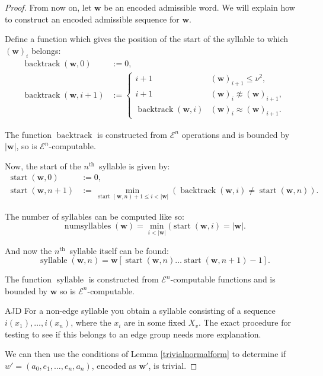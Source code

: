 \documentclass[a4paper]{article}
\newcommand{\grz}[1]{$\mathcal{E}^{#1}$}	%
\newcommand{\nth}{$n^{\textrm{th}}$~}	%
\newcommand{\wvec}{\mathbf{w}}	%
\newcommand{\recur}[1]{\begin{equation} \begin{split} #1 \end{split} \end{equation}}	%
\theoremstyle{plain}
\theoremstyle{definition}
\newenvironment{ad}{\noindent\color{blue} AJD }{}
\newcommand{\ajd}[1]{
\begin{ad} #1 \end{ad}}
\begin{document}
\begin{proof}
From now on, let $\wvec$ be an encoded admissible word.  We will explain how to construct an encoded admissible sequence for $\wvec$.

Define a function which gives the position of the start of the syllable to which $(\wvec)_i$ belongs:
\recur{
	\operatorname{backtrack}(\wvec,0) &:= 0, \\
	\operatorname{backtrack}(\wvec,i+1) &:= \begin{cases}
																					i+1	&	(\wvec)_{i+1} \leq \nu^2, \\
																					i+1	&	(\wvec)_i \not \approx (\wvec)_{i+1}, \\
																					\operatorname{backtrack}(\wvec,i)	&	(\wvec)_i \approx (\wvec)_{i+1}.
																				\end{cases}
}

The function $\operatorname{backtrack}$ is constructed from \grz{n} operations and is bounded by $|\wvec|$, so is \grz{n}-computable.

Now, the start of the \nth syllable is given by:
\recur{
\operatorname{start}(\wvec,0) &:= 0, \\
\operatorname{start}(\wvec,n+1) &:= \min_{\operatorname{start}(\wvec,n)+1 \leq i < |\wvec|} (\operatorname{backtrack}(\wvec,i) \neq \operatorname{start}(\wvec,n)).
}

The number of syllables can be computed like so:
\begin{equation} \operatorname{numsyllables}(\wvec) = \min_{i < |\wvec|} ( \operatorname{start}(\wvec,i) = |\wvec|. \end{equation}

And now the \nth syllable itself can be found:
\begin{equation} \operatorname{syllable}(\wvec,n) = \wvec[\operatorname{start}(\wvec,n) \dots \operatorname{start}(\wvec,n+1)-1]. \end{equation}

The function $\operatorname{syllable}$ is constructed from \grz{n}-computable functions and is bounded by $\wvec$ so is \grz{n}-computable.
\ajd{For a non-edge syllable you obtain a syllable consisting of a 
 sequence $i(x_1), \ldots ,i(x_n)$, 
where the $x_i$ are in some fixed $X_v$. The exact procedure for testing to see if 
this 
belongs to an edge group needs more explanation.}

We can then use the conditions of Lemma \ref{trivialnormalform} to determine if $w' = (a_0,e_1, \dots, e_n, a_n)$, encoded as $\wvec'$, is trivial.


\end{proof}
\end{document}
